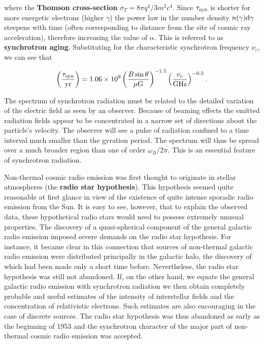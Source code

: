 \documentclass[a4paper,10pt]{article}
\begin{document}
{\noindent}where the \textbf{Thomson cross-section} $\sigma_T=8\pi q^4/3m^2c^4$. Since $\tau_{\rm syn}$ is shorter for more energetic electrons (higher $\gamma$) the power law in the number density $n(\gamma){\rm d}\gamma$ steepens with time (often corresponding to distance from the site of cosmic ray acceleration), therefore increasing the value of $\alpha$. This is referred to as \textbf{synchrotron aging}. Substituting for the characteristic synchrotron frequency $\nu_c$, we can see that

\begin{align*}
    \left(\frac{\tau_{\rm syn}}{{\rm yr}}\right) = 1.06\times10^9 \left(\frac{B\sin\theta}{\mu{\rm G}}\right)^{-1.5} \left(\frac{\nu_c}{{\rm GHz}}\right)^{-0.5}.
\end{align*}

{\noindent}The spectrum of synchrotron radiation must be related to the detailed variation of the electric field as seen by an observer. Because of beaming effects the emitted radiation fields appear to be concentrated in a narrow set of directions about the particle's velocity. The observer will see a pulse of radiation confined to a time interval much smaller than the gyration period. The spectrum will thus be spread over a much broader region than one of order $\omega_B/2\pi$. This is an essential feature of synchrotron radiation.

{\noindent}Non-thermal cosmic radio emission was first thought to originate in stellar atmospheres (the \textbf{radio star hypothesis}). This hypothesis seemed quite reasonable at first glance in view of the existence of quite intense sporadic radio emission from the Sun. It is easy to see, however, that to explain the observed data, these hypothetical radio stars would need to possess extremely unusual properties. The discovery of a quasi-spherical component of the general galactic radio emission imposed severe demands on the radio star hypothesis. For instance, it became clear in this connection that sources of non-thermal galactic radio emission were distributed principally in the galactic halo, the discovery of which had been made only a short time before. Nevertheless, the radio star hypothesis was still not abandoned. If, on the other hand, we equate the general galactic radio emission with synchrotron radiation we then obtain completely probable and useful estimates of the intensity of interstellar fields and the concentration of relativistic electrons. Such estimates are also encouraging in the case of discrete sources. The radio star hypothesis was thus abandoned as early as the beginning of 1953 and the synchrotron character of the major part of non-thermal cosmic radio emission was accepted. 
\end{document}
